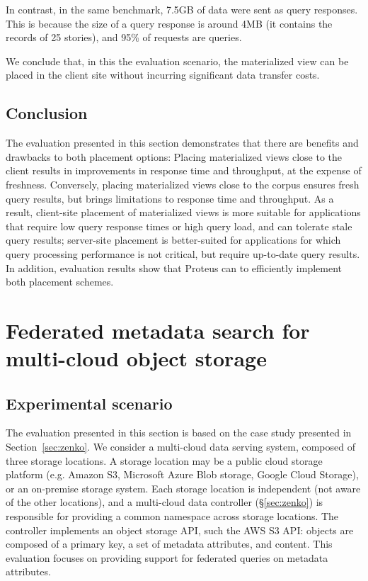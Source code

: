 In contrast, in the same benchmark, 7.5GB of data were sent as query responses.
This is because the size of a query response is around 4MB
(it contains the records of 25 stories), and 95\% of requests are queries.

We conclude that, in this the evaluation scenario, the materialized view can be placed in the client site without incurring
significant data transfer costs.

\subsection{Conclusion}

The evaluation presented in this section demonstrates that there are benefits and drawbacks to both placement options:
Placing materialized views close to the client results in improvements in response time and throughput,
at the expense of freshness.
Conversely, placing materialized views close to the corpus ensures fresh query results,
but brings limitations to response time and throughput.
As a result, client-site placement of materialized views is more suitable for applications that require low query response times or high
query load, and can tolerate stale query results;
server-site placement is better-suited for applications for which query processing performance is not critical,
but require up-to-date query results.
In addition, evaluation results show that Proteus can to efficiently implement both placement schemes.


\section{Federated metadata search for multi-cloud object storage}
\label{sec:eval_2}

\subsection{Experimental scenario}

The evaluation presented in this section is based on the case study presented in Section~\ref{sec:zenko}.
We consider a multi-cloud data serving system, composed of three storage locations.
A storage location may be a public cloud storage platform (e.g. Amazon S3, Microsoft Azure Blob storage, Google Cloud Storage),
or an on-premise storage system.
Each storage location is independent (not aware of the other locations),
and a multi-cloud data controller (\S\ref{sec:zenko}) is responsible for providing a common namespace across storage locations.
The controller implements an object storage API, such the AWS S3 API:
objects are composed of a primary key, a set of metadata attributes, and content.
This evaluation focuses on providing support for federated queries on metadata attributes.

